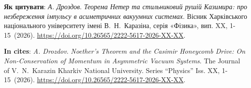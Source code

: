 \documentclass[twoside, 10pt]{article}
\def\myfirstpage{1}
\def\mylastpage{15}
\def\mypages{\myfirstpage-\mylastpage}
\def\myname{A. Drozdov}
\def\mynameukr{А. Дроздов}
\def\mytitle{Noether's Theorem and the Casimir Honeycomb Drive: On Non-Conservation of Momentum in Asymmetric Vacuum Systems}
\def\mytitleukr{Теорема Нетер та стильниковий рушій Казимира: про незбереження імпульсу в асиметричних вакуумних системах}
\def\mydoi{10.26565/2222-5617-2026-XX-XX} %
\def\ukrvisnyk{Вісник Харківського національного університету імені В.~Н.~Каразіна, серія «Фізика», вип. XX, \mypages~(2026)}
\def\envisnyk{The Journal of V.~N.~Karazin Kharkiv National University. Series “Physics” Iss. XX, \mypages~(2026)}
\begin{document}
\vspace{5mm}

\selectfont

\noindent
\textbf{Як цитувати}: \textit{\mynameukr}. \textit{\mytitleukr}. {\ukrvisnyk}. \href{https://doi.org/\mydoi} {https://doi.org/\mydoi}.

\vspace{5mm}

\selectfont

\noindent
\textbf{In cites}: \textit{\myname}. \textit{\mytitle}. {\envisnyk}. \href{https://doi.org/\mydoi} {https://doi.org/\mydoi}.

\vspace{5mm}

\newpage
\end{document}
